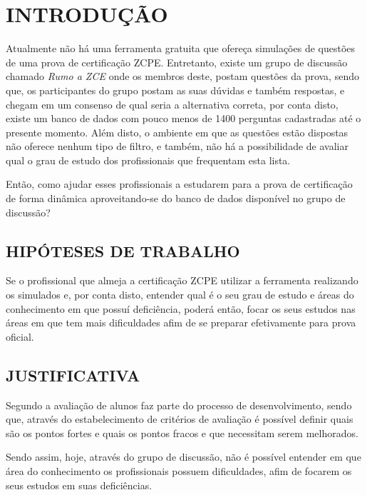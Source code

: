 \chapter{INTRODUÇÃO}
\label{chp:intro}

Atualmente não há uma ferramenta gratuita que ofereça simulações de questões de 
uma prova de certificação \ac{ZCPE}. Entretanto, existe um 
grupo de discussão chamado \textit{Rumo a ZCE} onde os membros deste, postam
questões da prova, sendo que, os participantes do grupo postam as suas dúvidas 
e também respostas, e chegam em um consenso de qual seria a alternativa correta,
por conta disto, existe um banco de dados com pouco menos de 1400 perguntas 
cadastradas até o presente momento. Além disto, o ambiente em que as questões 
estão dispostas não oferece nenhum tipo de filtro, e também, não há a 
possibilidade de avaliar qual o grau de estudo dos profissionais que frequentam 
esta lista.

Então, como ajudar esses profissionais a estudarem para a prova de certificação 
de forma dinâmica aproveitando-se do banco de dados disponível no grupo de 
discussão?

\section{HIPÓTESES DE TRABALHO}

Se o profissional que almeja a certificação \acs{ZCPE} utilizar a ferramenta
realizando os simulados e, por conta disto, entender qual é o seu grau de estudo e áreas 
do conhecimento em que possuí deficiência, poderá então, focar os seus estudos 
nas áreas em que tem mais dificuldades afim de se preparar efetivamente para 
prova oficial.

\section{JUSTIFICATIVA}

Segundo  a avaliação de  alunos
faz parte do processo de desenvolvimento, sendo que, através do estabelecimento 
de critérios de avaliação é possível definir quais são os pontos fortes e  quais
os pontos fracos e que necessitam serem melhorados.

Sendo assim, hoje, através do grupo de discussão, não é possível entender em 
que área do conhecimento os profissionais possuem dificuldades, afim de focarem
os seus estudos em suas deficiências.

